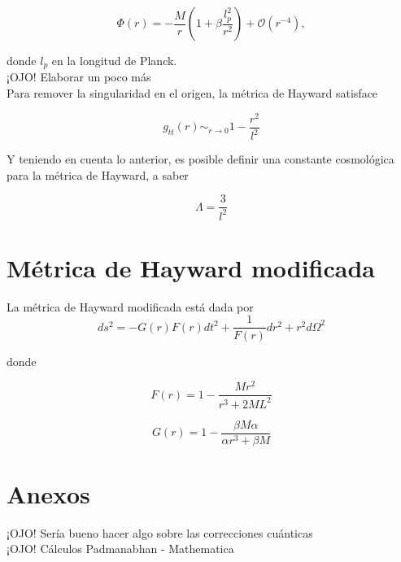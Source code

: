 \documentclass[prb,aps,preprintnumbers,amsmath,amssymb]{article}
\numberwithin{equation}{section}
\begin{document}
\begin{equation}
\label{new}
\Phi (r) = -\frac{M}{r} \left( 1 + \beta \frac{l_{p}^2}{r^2} \right) + \mathcal{O}(r^{-4}),
\end{equation}

donde $l_{p}$ en la longitud de Planck.\\

¡OJO! Elaborar un poco más\\

Para remover la singularidad en el origen, la métrica de Hayward satisface 

\begin{equation}
g_{tt}(r) \sim_{r \to 0} 1 - \frac{r^2}{l^2}
\end{equation}

Y teniendo en cuenta lo anterior, es posible definir una constante cosmológica para la métrica de Hayward, a saber

\begin{equation}
\Lambda = \frac{3}{l^2}
\end{equation}

\section{Métrica de Hayward modificada}

La métrica de Hayward modificada está dada por 
\begin{equation}
\label{reg-sch}
ds^2 = -G(r)F(r) dt^2 + \frac{1}{F(r)} dr^2 + r^2d\Omega ^2
\end{equation}

donde

\begin{equation}
\label{mod-hay-f}
F(r) = 1 - \frac{Mr^2}{r^3 + 2ML^2}
\end{equation}

\begin{equation}
\label{mod-hay-g}
G(r) = 1 - \frac{\beta M \alpha}{\alpha r^3 + \beta M}
\end{equation}

\section{Anexos}

¡OJO! Sería bueno hacer algo sobre las correcciones cuánticas\\

¡OJO! Cálculos Padmanabhan - Mathematica\\
\end{document}
